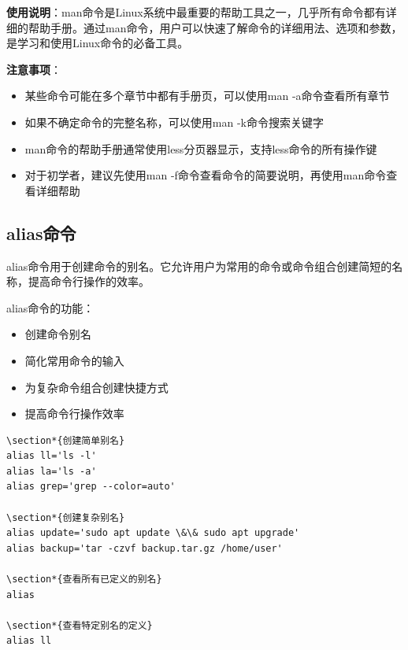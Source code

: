 \documentclass[12pt,UTF8]{ctexbook}
\begin{document}
\textbf{使用说明}：man命令是Linux系统中最重要的帮助工具之一，几乎所有命令都有详细的帮助手册。通过man命令，用户可以快速了解命令的详细用法、选项和参数，是学习和使用Linux命令的必备工具。

\textbf{注意事项}：
\begin{itemize}
    \item 某些命令可能在多个章节中都有手册页，可以使用man -a命令查看所有章节
    \item 如果不确定命令的完整名称，可以使用man -k命令搜索关键字
    \item man命令的帮助手册通常使用less分页器显示，支持less命令的所有操作键
    \item 对于初学者，建议先使用man -f命令查看命令的简要说明，再使用man命令查看详细帮助
\end{itemize}

\subsection{alias命令}
alias命令用于创建命令的别名。它允许用户为常用的命令或命令组合创建简短的名称，提高命令行操作的效率。

alias命令的功能：
\begin{itemize}
    \item 创建命令别名
    \item 简化常用命令的输入
    \item 为复杂命令组合创建快捷方式
    \item 提高命令行操作效率
\end{itemize}

\begin{verbatim}
\section*{创建简单别名}
alias ll='ls -l'
alias la='ls -a'
alias grep='grep --color=auto'

\section*{创建复杂别名}
alias update='sudo apt update \&\& sudo apt upgrade'
alias backup='tar -czvf backup.tar.gz /home/user'

\section*{查看所有已定义的别名}
alias

\section*{查看特定别名的定义}
alias ll
\end{verbatim}
\end{document}
